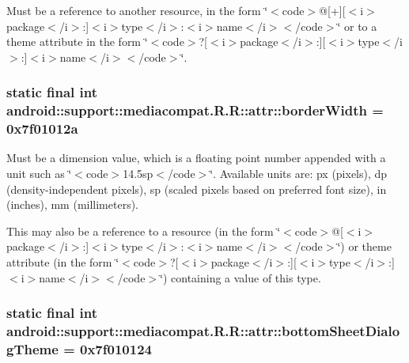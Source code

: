 Must be a reference to another resource, in the form \char`\"{}$<$code$>$@\mbox{[}+\mbox{]}\mbox{[}$<$i$>$package$<$/i$>$:\mbox{]}$<$i$>$type$<$/i$>$:$<$i$>$name$<$/i$>$$<$/code$>$\char`\"{} or to a theme attribute in the form \char`\"{}$<$code$>$?\mbox{[}$<$i$>$package$<$/i$>$:\mbox{]}\mbox{[}$<$i$>$type$<$/i$>$:\mbox{]}$<$i$>$name$<$/i$>$$<$/code$>$\char`\"{}. \hypertarget{classandroid_1_1support_1_1mediacompat_1_1_r_1_1attr_e4805eee9429b39b50d09f8125e26639}{
\subsubsection[{borderWidth}]{\setlength{\rightskip}{0pt plus 5cm}static final int android::support::mediacompat.R.R::attr::borderWidth = 0x7f01012a}}
\label{classandroid_1_1support_1_1mediacompat_1_1_r_1_1attr_e4805eee9429b39b50d09f8125e26639}


Must be a dimension value, which is a floating point number appended with a unit such as \char`\"{}$<$code$>$14.5sp$<$/code$>$\char`\"{}. Available units are: px (pixels), dp (density-independent pixels), sp (scaled pixels based on preferred font size), in (inches), mm (millimeters). 

This may also be a reference to a resource (in the form \char`\"{}$<$code$>$@\mbox{[}$<$i$>$package$<$/i$>$:\mbox{]}$<$i$>$type$<$/i$>$:$<$i$>$name$<$/i$>$$<$/code$>$\char`\"{}) or theme attribute (in the form \char`\"{}$<$code$>$?\mbox{[}$<$i$>$package$<$/i$>$:\mbox{]}\mbox{[}$<$i$>$type$<$/i$>$:\mbox{]}$<$i$>$name$<$/i$>$$<$/code$>$\char`\"{}) containing a value of this type. \hypertarget{classandroid_1_1support_1_1mediacompat_1_1_r_1_1attr_b4fe1b9493d0f81487e79574c58ae17b}{
\subsubsection[{bottomSheetDialogTheme}]{\setlength{\rightskip}{0pt plus 5cm}static final int android::support::mediacompat.R.R::attr::bottomSheetDialogTheme = 0x7f010124}}
\label{classandroid_1_1support_1_1mediacompat_1_1_r_1_1attr_b4fe1b9493d0f81487e79574c58ae17b}


